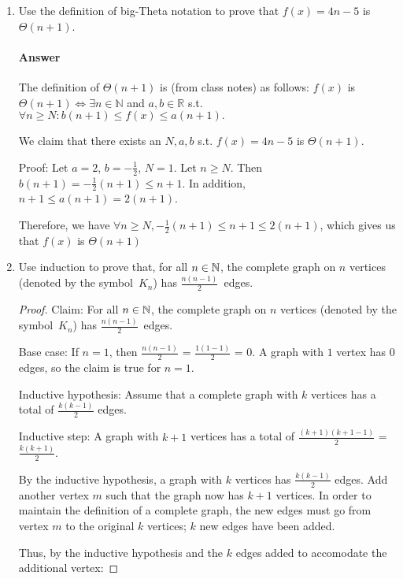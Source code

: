 \documentclass{article}
\begin{document}
\begin{enumerate}

    \item Use the definition of big-Theta notation to prove that $f(x)=4n-5$
        is $\Theta(n+1)$.

        \paragraph{Answer}{The definition of $\Theta(n+1)$ is (from class notes) as follows: $f(x)$ is $\Theta(n+1) \Leftrightarrow \exists  n \in \mathbb{N}$ and $a, b \in \mathbb{R}$ s.t. $\forall n \geq N: b(n + 1) \leq f(x) \leq a(n + 1).$ 

We claim that there exists an $N, a, b$ s.t. $f(x) = 4n-5$ is $\Theta(n + 1).$ 

Proof: Let $a = 2$, $b = -\frac{1}{2}$, $N = 1$. Let $n \geq N$. Then $b(n+1) = -\frac{1}{2}(n+1) \leq n+1$. In addition, $n + 1 \leq a(n+1) = 2(n+1)$. 

Therefore, we have $\forall n \geq N, -\frac{1}{2}(n+1) \leq n + 1 \leq 2(n+1)$, which gives us that $f(x)$ is $\Theta(n+1)$}

    \item Use induction to prove that, for all $n \in {\mathbb N}$, the complete graph on
        $n$ vertices (denoted by the symbol~$K_n$) has $\frac{n(n-1)}{2}$~edges.

        \begin{proof}
	Claim: For all $n \in {\mathbb N}$, the complete graph on
        $n$ vertices (denoted by the symbol~$K_n$) has $\frac{n(n-1)}{2}$~edges.
	
	Base case: If $n = 1$, then $\frac{n(n-1)}{2}$ = $\frac{1(1-1)}{2}$ = $0$. A graph with $1$ vertex has $0$ edges, so the claim is true for $n = 1$.

	Inductive hypothesis: Assume that a complete graph with $k$ vertices has a total of $\frac{k(k-1)}{2}$ edges.

	Inductive step: A graph with $k + 1$ vertices has a total of $\frac{(k+1)(k+1-1)}{2}$ = $\frac{k(k+1)}{2}$. 

	By the inductive hypothesis, a graph with $k$ vertices has $\frac{k(k-1)}{2}$ edges. Add another vertex $m$ such that the graph now has $k+1$ vertices. In order to maintain the definition of a complete graph, the new edges must go from vertex $m$ to the original $k$ vertices; $k$ new edges have been added. 

	Thus, by the inductive hypothesis and the $k$ edges added to accomodate the additional vertex: 


\end{proof}
\end{enumerate}
\end{document}
